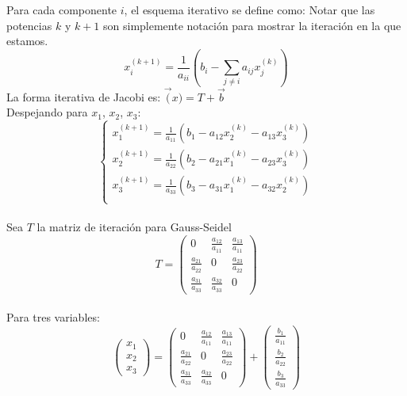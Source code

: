 Para cada componente $i$, el esquema iterativo se define como:
Notar que las potencias $k$ y $k+1$ son simplemente notación para mostrar la iteración en la que estamos.
\begin{equation}
    x_i^{(k+1)} = \frac{1}{a_{ii}} \left( b_i - \sum_{j \neq i} a_{ij} x_j^{(k)} \right)
\end{equation}
La forma iterativa de Jacobi es:
$\vec(x)=T+\vec{b}$ \\
Despejando para $x_1$, $x_2$, $x_3$:
\begin{equation}
    \begin{cases}
        x_1^{(k+1)} = \frac{1}{a_{11}} \left( b_1 - a_{12}x_2^{(k)} - a_{13}x_3^{(k)} \right)\\
        x_2^{(k+1)} = \frac{1}{a_{22}} \left( b_2 - a_{21}x_1^{(k)} - a_{23}x_3^{(k)} \right)\\
        x_3^{(k+1)} = \frac{1}{a_{33}} \left( b_3 - a_{31}x_1^{(k)} - a_{32}x_2^{(k)} \right)\\
    \end{cases}
\end{equation}\\
Sea $T$ la matriz de iteración para Gauss-Seidel
\begin{equation}
    T=\begin{pmatrix}
        0 & \frac{a_{12}}{a_{11}} & \frac{a_{13}}{a_{11}} \\
        \frac{a_{21}}{a_{22}} & 0 & \frac{a_{23}}{a_{22}} \\
        \frac{a_{31}}{a_{33}} & \frac{a_{32}}{a_{33}} & 0
    \end{pmatrix}
\end{equation}\\
Para tres variables:
\begin{equation}
    \begin{pmatrix}x_1 \\x_2 \\ x_3
    \end{pmatrix}=\begin{pmatrix}
        0 & \frac{a_{12}}{a_{11}} & \frac{a_{13}}{a_{11}} \\
        \frac{a_{21}}{a_{22}} & 0 & \frac{a_{23}}{a_{22}} \\
        \frac{a_{31}}{a_{33}} & \frac{a_{32}}{a_{33}} & 0
    \end{pmatrix}+ \begin{pmatrix} \frac{b_1}{a_{11}} \\ \frac{b_2}{a_{22}} \\ \frac{b_3}{a_{33}}
    \end{pmatrix}
\end{equation}
\newpage
